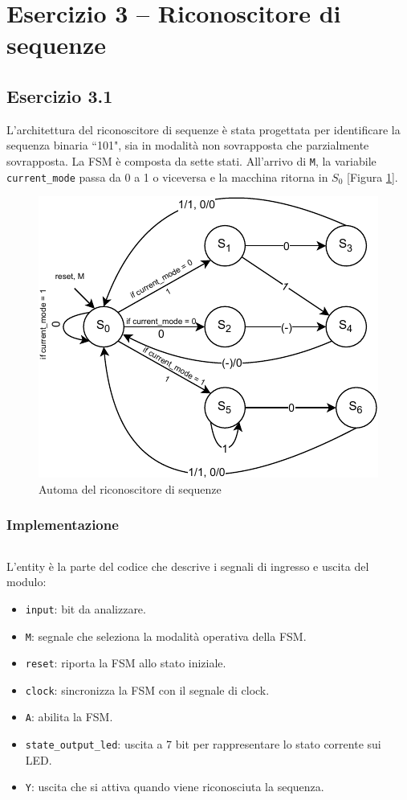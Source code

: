 \section{Esercizio 3 -- Riconoscitore di sequenze}
\subsection{Esercizio 3.1}
L'architettura del riconoscitore di sequenze è stata progettata per identificare la sequenza binaria ``101", sia in modalità non sovrapposta che parzialmente sovrapposta. La FSM è composta da sette stati. All'arrivo di \texttt{M}, la variabile \texttt{current\_mode} passa da 0 a 1 o viceversa e la macchina ritorna in $S_0$ [Figura \ref{fig:sequence_detector}].

\begin{figure}[h]
    \centering
    \includegraphics[width=0.55\linewidth]{img/sequence_detector.pdf}
    \caption{Automa del riconoscitore di sequenze}
    \label{fig:sequence_detector}
\end{figure}

\subsubsection{Implementazione}
\begin{code}
    \inputminted{vhdl}{vhdl/Sequence_Detector.vhd}
    \caption{Implementazione del riconoscitore di sequenze}
    \label{cod:sequence_detector}
\end{code}

L'entity è la parte del codice che descrive i segnali di ingresso e uscita del modulo:

\begin{itemize}
    \item \texttt{input}: bit da analizzare.
    \item \texttt{M}: segnale che seleziona la modalità operativa della FSM.
    \item \texttt{reset}: riporta la FSM allo stato iniziale.
    \item \texttt{clock}: sincronizza la FSM con il segnale di clock.
    \item \texttt{A}: abilita la FSM.
    \item \texttt{state\_output\_led}: uscita a 7 bit per rappresentare lo stato corrente sui LED.
    \item \texttt{Y}: uscita che si attiva quando viene riconosciuta la sequenza.
\end{itemize}

